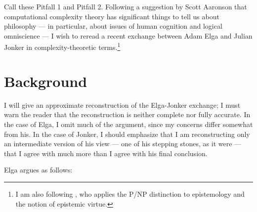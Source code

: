 \documentclass[letterpaper,12pt]{article}
\begin{document}
Call these Pitfall 1 and Pitfall 2. Following a suggestion by Scott Aaronson \citeyearpar{DBLP:journals/corr/abs-1108-1791} that computational complexity theory has significant things to tell us about philosophy --- in particular, about issues of human cognition and logical omniscience --- I wish to reread a recent exchange between Adam Elga and Julian Jonker in complexity-theoretic terms.\footnote{I am also following \cite{NOUS:NOUS479}, who applies the P/NP distinction to epistemology and the notion of epistemic virtue.}

\section{Background}
I will give an approximate reconstruction of the Elga-Jonker exchange; I must warn the reader that the reconstruction is neither complete nor fully accurate. In the case of Elga, I omit much of the argument, since my concerns differ somewhat from his. In the case of Jonker, I should emphasize that I am reconstructing only an intermediate version of his view --- one of his stepping stones, as it were --- that I agree with much more than I agree with his final conclusion.

Elga \citeyearpar{elga2010subjective} argues as follows:
\end{document}
